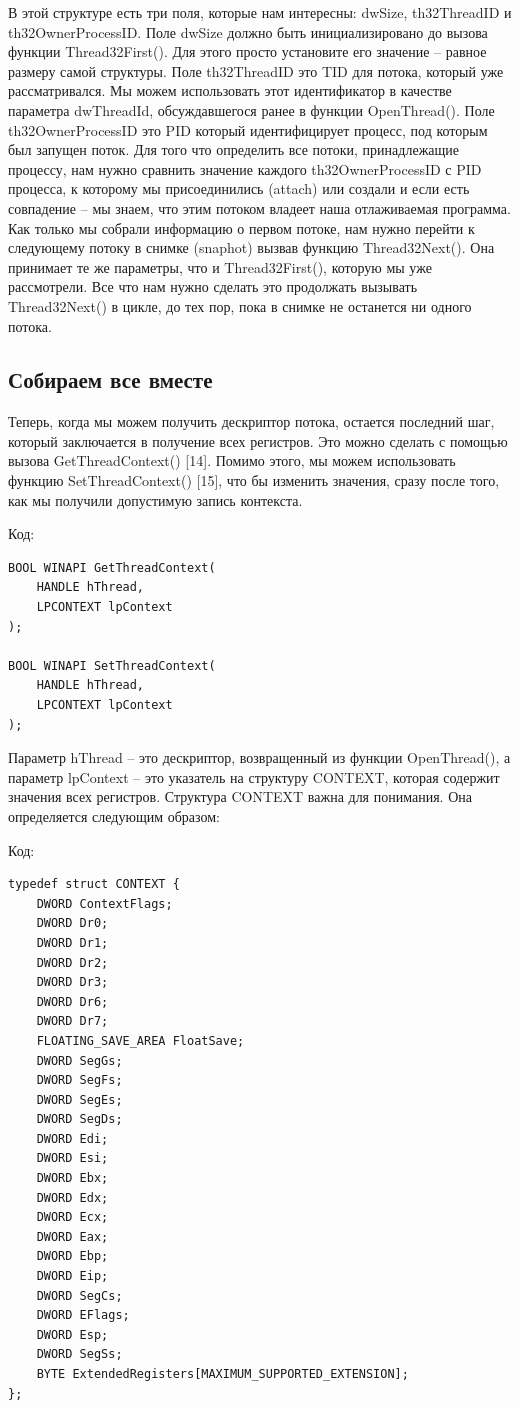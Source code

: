 \documentclass[12pt]{book}
\begin{document}
В этой структуре есть три поля, которые нам интересны: dwSize, th32ThreadID и th32OwnerProcessID. Поле dwSize должно быть инициализировано до вызова функции Thread32First(). Для этого просто установите его значение – равное размеру самой структуры. Поле th32ThreadID это TID для потока, который уже рассматривался. Мы можем использовать этот идентификатор в качестве параметра dwThreadId, обсуждавшегося ранее в функции OpenThread(). Поле th32OwnerProcessID это PID который идентифицирует процесс, под которым был запущен поток. Для того что определить все потоки, принадлежащие процессу, нам нужно сравнить значение каждого th32OwnerProcessID с PID процесса, к которому мы присоединились (attach) или создали и если есть совпадение – мы знаем, что этим потоком владеет наша отлаживаемая программа. Как только мы собрали информацию о первом потоке, нам нужно перейти к следующему потоку в снимке (snaphot) вызвав функцию Thread32Next(). Она принимает те же параметры, что и Thread32First(), которую мы уже рассмотрели. Все что нам нужно сделать это продолжать вызывать Thread32Next() в цикле, до тех пор, пока в снимке не останется ни одного потока.

\subsection{Собираем все вместе}

Теперь, когда мы можем получить дескриптор потока, остается последний шаг, который заключается в получение всех регистров. Это можно сделать с помощью вызова GetThreadContext() [14]. Помимо этого, мы можем использовать функцию SetThreadContext() [15], что бы изменить значения, сразу после того, как мы получили допустимую запись контекста.

Код:
\begin{lstlisting}
BOOL WINAPI GetThreadContext(
    HANDLE hThread,
    LPCONTEXT lpContext
);

BOOL WINAPI SetThreadContext(
    HANDLE hThread,
    LPCONTEXT lpContext
);
\end{lstlisting}

Параметр hThread – это дескриптор, возвращенный из функции OpenThread(), а параметр lpContext – это указатель на структуру CONTEXT, которая содержит значения всех регистров. Структура CONTEXT важна для понимания. Она определяется следующим образом: 

Код:
\begin{lstlisting}
typedef struct CONTEXT {
    DWORD ContextFlags;
    DWORD Dr0;
    DWORD Dr1;
    DWORD Dr2;
    DWORD Dr3;
    DWORD Dr6;
    DWORD Dr7;
    FLOATING_SAVE_AREA FloatSave;
    DWORD SegGs;
    DWORD SegFs;
    DWORD SegEs;
    DWORD SegDs;
    DWORD Edi;
    DWORD Esi;
    DWORD Ebx;
    DWORD Edx;
    DWORD Ecx;
    DWORD Eax;
    DWORD Ebp;
    DWORD Eip;
    DWORD SegCs;
    DWORD EFlags;
    DWORD Esp;
    DWORD SegSs;
    BYTE ExtendedRegisters[MAXIMUM_SUPPORTED_EXTENSION];
};
\end{lstlisting}
\end{document}
